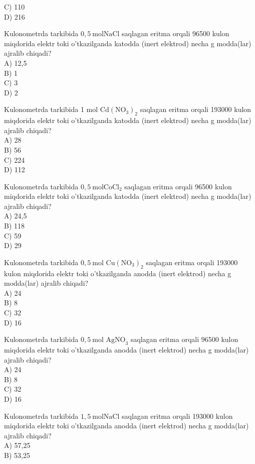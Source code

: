 C) 110\\
D) 216
  \item Kulonometrda tarkibida $0,5 \mathrm{~mol} \mathrm{NaCl}$ saqlagan eritma orqali 96500 kulon miqdorida elektr toki o'tkazilganda katodda (inert elektrod) necha g modda(lar) ajralib chiqadi?\\
A) 12,5\\
B) 1\\
C) 3\\
D) 2
  \item Kulonometrda tarkibida 1 mol $\mathrm{Cd}\left(\mathrm{NO}_{3}\right)_{2}$ saqlagan eritma orqali 193000 kulon miqdorida elektr toki o'tkazilganda katodda (inert elektrod) necha g modda(lar) ajralib chiqadi?\\
A) 28\\
B) 56\\
C) 224\\
D) 112
  \item Kulonometrda tarkibida $0,5 \mathrm{~mol} \mathrm{CoCl}_{2}$ saqlagan eritma orqali 96500 kulon miqdorida elektr toki o'tkazilganda katodda (inert elektrod) necha g modda(lar) ajralib chiqadi?\\
A) 24,5\\
B) 118\\
C) 59\\
D) 29
  \item Kulonometrda tarkibida $0,5 \mathrm{~mol}$ $\mathrm{Cu}\left(\mathrm{NO}_{3}\right)_{2}$ saqlagan eritma orqali 193000 kulon miqdorida elektr toki o'tkazilganda anodda (inert elektrod) necha g modda(lar) ajralib chiqadi?\\
A) 24\\
B) 8\\
C) 32\\
D) 16
  \item Kulonometrda tarkibida $0,5 \mathrm{~mol}$ $\mathrm{AgNO}_{3}$ saqlagan eritma orqali 96500 kulon miqdorida elektr toki o'tkazilganda anodda (inert elektrod) necha g modda(lar) ajralib chiqadi?\\
A) 24\\
B) 8\\
C) 32\\
D) 16
  \item Kulonometrda tarkibida $1,5 \mathrm{~mol} \mathrm{NaCl}$ saqlagan eritma orqali 193000 kulon miqdorida elektr toki o'tkazilganda anodda (inert elektrod) necha g modda(lar) ajralib chiqadi?\\
A) 57,25\\
B) 53,25\\
